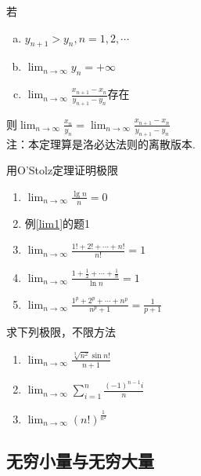 \begin{theorem}%
若\begin{enumerate}[(a)]
	\item $y_{n+1}>y_n,n=1,2,\cdots$
	\item $\displaystyle\lim_{n\to\infty}y_n=+\infty$
	\item $\displaystyle\lim_{n\to\infty}\frac{x_{n+1}-x_n}{y_{n+1}-y_n}$存在
\end{enumerate}
则$\displaystyle\lim_{n\to\infty}\frac{x_n}{y_n}=\lim_{n\to\infty}\frac{x_{n+1}-x_n}{y_{n+1}-y_n}$\\
注：本定理算是洛必达法则的离散版本.
\end{theorem}
\begin{exercise}
用O'Stolz定理证明极限
\begin{enumerate}
	\item $\displaystyle\lim_{n\to\infty}\frac{\lg n}{n}=0$
	\item 例\ref{lim1}的题1
	\item $\displaystyle\lim_{n\to\infty}\frac{1!+2!+\cdots+n!}{n!}=1$
	\item $\displaystyle\lim_{n\to\infty}\frac{1+\frac{1}{2}+\cdots+\frac{1}{n}}{\ln n}=1$
	\item $\displaystyle\lim_{n\to\infty}\frac{1^p+2^p+\cdots+n^p}{n^p+1}=\frac{1}{p+1}$
\end{enumerate}
\end{exercise}
\begin{exercise}
求下列极限，不限方法
\begin{enumerate}
	\item $\displaystyle\lim_{n\to\infty}\frac{\sqrt[3]{n^2}\sin n!}{n+1}$
	\item $\displaystyle\lim_{n\to\infty}\sum_{i=1}^n\frac{(-1)^{n-1}i}{n}$
	\item $\displaystyle\lim_{n\to\infty}(n!)^{\frac{1}{n^2}}$
\end{enumerate}
\end{exercise}

\subsection{无穷小量与无穷大量}
